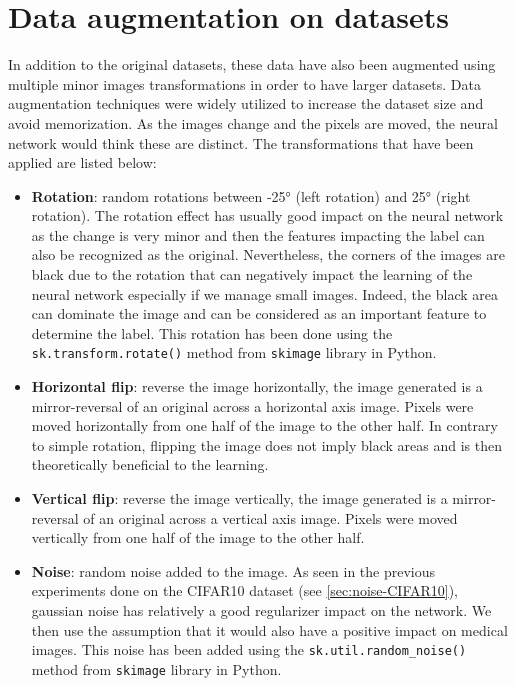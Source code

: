 \documentclass[11pt, openany]{report}
\theoremstyle{plain}
\theoremstyle{definition}
\theoremstyle{remark}
\begin{document}
\section{Data augmentation on datasets} \label{sec:data-aug-leuk}

In addition to the original datasets, these data have also been augmented using multiple minor images transformations in order to have larger datasets. Data augmentation techniques were widely utilized to increase the dataset size and avoid memorization. As the images change and the pixels are moved, the neural network would think these are distinct. The transformations that have been applied are listed below: 

\begin{itemize}
\item \textbf{Rotation}: random rotations between -25° (left rotation) and 25° (right rotation). The rotation effect has usually good impact on the neural network as the change is very minor and then the features impacting the label can also be recognized as the original. Nevertheless, the corners of the images are black due to the rotation that can negatively impact the learning of the neural network especially if we manage small images. Indeed, the black area can dominate the image and can be considered as an important feature to determine the label. This rotation has been done using the \texttt{sk.transform.rotate()} method from \texttt{skimage} library in Python.  
  
\item \textbf{Horizontal flip}: reverse the image horizontally, the image generated is a mirror-reversal of an original across a horizontal axis image. Pixels were moved horizontally from one half of the image to the other half. In contrary to simple rotation, flipping the image does not imply black areas and is then theoretically beneficial to the learning.    

\item \textbf{Vertical flip}: reverse the image vertically, the image generated is a mirror-reversal of an original across a vertical axis image. Pixels were moved vertically from one half of the image to the other half.

\item \textbf{Noise}: random noise added to the image. As seen in the previous experiments done on the CIFAR10 dataset (see \autoref{sec:noise-CIFAR10}), gaussian noise has relatively a good regularizer impact on the network. We then use the assumption that it would also have a positive impact on medical images. This noise has been added using the \texttt{sk.util.random\_noise()} method from \texttt{skimage} library in Python.   


\end{itemize}
\end{document}
